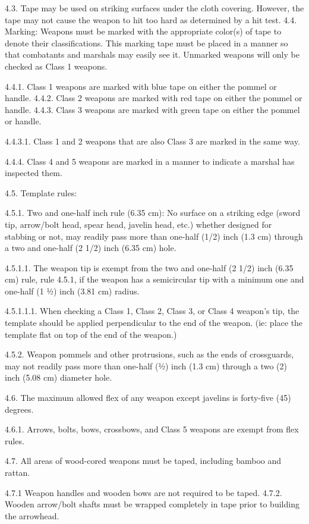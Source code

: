 \documentclass[12pt]{article}
\begin{document}
\begin{level}[start=0]
4.3. Tape may be used on striking surfaces under the cloth covering. However, the tape may not cause the weapon to hit too hard as determined by a hit test.
4.4. Marking: Weapons must be marked with the appropriate color(s) of tape to denote their classifications. This marking tape must be placed in a manner so that combatants and marshals may easily see it. Unmarked weapons will only be checked as Class 1 weapons.

4.4.1. Class 1 weapons are marked with blue tape on either the pommel or handle.
4.4.2. Class 2 weapons are marked with red tape on either the pommel or handle.
4.4.3. Class 3 weapons are marked with green tape on either the pommel or handle.

4.4.3.1. Class 1 and 2 weapons that are also Class 3 are marked in the same way.

4.4.4. Class 4 and 5 weapons are marked in a manner to indicate a marshal has inspected them.

4.5. Template rules:

4.5.1. Two and one-half inch rule (6.35 cm): No surface on a striking edge (sword tip, arrow/bolt head, spear head, javelin head, etc.) whether designed for stabbing or not, may readily pass more than one-half (1/2) inch (1.3 cm) through a two and one-half (2 1/2) inch (6.35 cm) hole.

4.5.1.1. The weapon tip is exempt from the two and one-half (2 1/2) inch (6.35 cm) rule, rule 4.5.1, if the weapon has a semicircular tip with a minimum one and one-half (1 ½) inch (3.81 cm) radius.

4.5.1.1.1. When checking a Class 1, Class 2, Class 3, or Class 4 weapon’s tip, the template should be applied perpendicular to the end of the weapon. (ie: place the template flat on top of the end of the weapon.)

4.5.2. Weapon pommels and other protrusions, such as the ends of crossguards, may not readily pass more than one-half (½) inch (1.3 cm) through a two (2) inch (5.08 cm) diameter hole.

4.6. The maximum allowed flex of any weapon except javelins is forty-five (45) degrees.

4.6.1. Arrows, bolts, bows, crossbows, and Class 5 weapons are exempt from flex rules.

4.7. All areas of wood-cored weapons must be taped, including bamboo and rattan.

4.7.1 Weapon handles and wooden bows are not required to be taped.
4.7.2. Wooden arrow/bolt shafts must be wrapped completely in tape prior to building the arrowhead.


\end{level}
\end{document}
